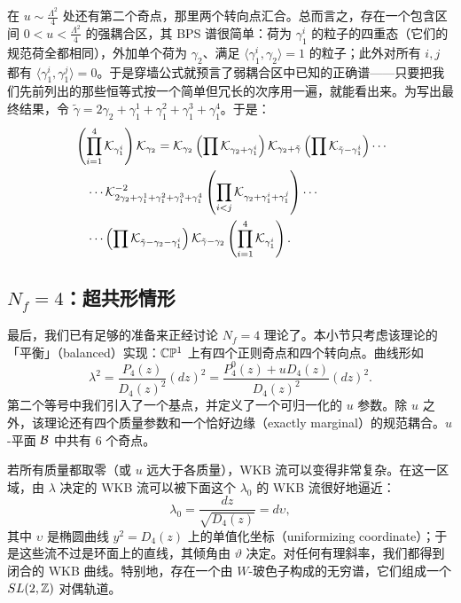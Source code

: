 在 $u\sim \frac{\Lambda^2}{4}$ 处还有第二个奇点，那里两个转向点汇合。总而言之，存在一个包含区间 $0<u<\frac{\Lambda^2}{4}$ 的强耦合区，其 BPS 谱很简单：荷为 $\gamma_1^i$ 的粒子的四重态（它们的规范荷全都相同），外加单个荷为 $\gamma_2$、满足 $\langle \gamma_1^i,\gamma_2\rangle=1$ 的粒子；此外对所有 $i,j$ 都有 $\langle \gamma_1^i,\gamma_1^j\rangle=0$。于是穿墙公式就预言了弱耦合区中已知的正确谱——只要把我们先前列出的那些恒等式按一个简单但冗长的次序用一遍，就能看出来。为写出最终结果，令 $\tilde\gamma = 2\gamma_2+\gamma_1^1+\gamma_1^2+\gamma_1^3+\gamma_1^4$。于是：
\begin{equation}
\begin{split}
&\left( \prod_{i=1}^4 \mathcal{K}_{\gamma_1^i}\right) \mathcal{K}_{\gamma_2} =
\mathcal{K}_{\gamma_2} \left( \prod \mathcal{K}_{\gamma_2+\gamma_1^i}\right) \mathcal{K}_{\gamma_2+\tilde \gamma}\left( \prod \mathcal{K}_{\tilde \gamma-\gamma_1^i}\right) \cdots \\
&\quad \cdots \mathcal{K}_{2\gamma_2+\gamma_1^1+\gamma_1^2+\gamma_1^3+\gamma_1^4}^{-2} \left(\prod_{i<j}\mathcal{K}_{\gamma_2+\gamma_1^i+\gamma_1^j}\right) \cdots \\
&\quad \cdots \left( \prod \mathcal{K}_{\tilde \gamma-\gamma_2-\gamma_1^i}\right)\mathcal{K}_{\tilde \gamma-\gamma_2}\left( \prod_{i=1}^4 \mathcal{K}_{\gamma_1^i}\right).
\end{split}
\end{equation}

\subsection{$N_f=4$：超共形情形} \label{subsec:SuperConformalCase}

最后，我们已有足够的准备来正经讨论 $N_f=4$ 理论了。本小节只考虑该理论的「平衡」（balanced）实现：$\mathbb{C}\mathbb{P}^1$ 上有四个正则奇点和四个转向点。\SW 曲线形如
\begin{equation}
\lambda^2 = \frac{P_4(z)}{D_4(z)^2}(dz)^2= \frac{P^0_4(z)+ u
D_4(z)}{D_4(z)^2}(dz)^2.
\end{equation}
第二个等号中我们引入了一个基点，并定义了一个可归一化的 $u$ 参数。除 $u$ 之外，该理论还有四个质量参数和一个恰好边缘（exactly marginal）的规范耦合。$u$-平面 $\mathcal{B}$ 中共有 $6$ 个奇点。

若所有质量都取零（或 $u$ 远大于各质量），WKB 流可以变得非常复杂。在这一区域，由 $\lambda$ 决定的 WKB 流可以被下面这个 $\lambda_0$ 的 WKB 流很好地逼近：
\begin{equation}
\lambda_0=\frac{dz}{\sqrt{D_4(z)}} = d\upsilon,
\end{equation}
其中 $\upsilon$ 是椭圆曲线 $y^2=D_4(z)$ 上的单值化坐标（uniformizing coordinate）；于是这些流不过是环面上的直线，其倾角由 $\vartheta$ 决定。对任何有理斜率，我们都得到闭合的 WKB 曲线。特别地，存在一个由 $W$-玻色子构成的无穷谱，它们组成一个 $SL(2,\mathbb{Z})$ 对偶轨道。

